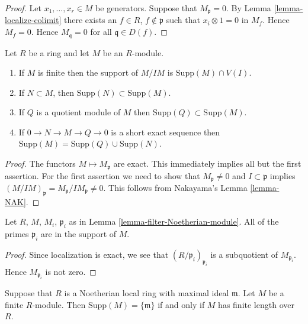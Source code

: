 \begin{proof}
Let $x_1, \ldots, x_r \in M$ be generators.
Suppose that $M_{\mathfrak p} = 0$.
By Lemma \ref{lemma-localize-colimit} there exists
an $f \in R$, $f\not\in \mathfrak p$ such that
$x_i\otimes 1 = 0$ in $M_f$. Hence $M_f = 0$.
Hence $M_{\mathfrak q} = 0$ for all $\mathfrak q\in D(f)$.
\end{proof}

\begin{lemma}
\label{lemma-support-quotient}
Let $R$ be a ring and let $M$ be an $R$-module.
\begin{enumerate}
\item If $M$ is finite then the support
of $M/IM$ is $\text{Supp}(M) \cap V(I)$.
\item If $N \subset M$, then $\text{Supp}(N) \subset
\text{Supp}(M)$.
\item If $Q$ is a quotient module of $M$ then $\text{Supp}(Q) \subset
\text{Supp}(M)$.
\item If $0 \to N \to M \to Q \to 0$ is a short exact sequence
then $\text{Supp}(M) = \text{Supp}(Q) \cup
\text{Supp}(N)$.
\end{enumerate}
\end{lemma}

\begin{proof}
The functors $M \mapsto M_{\mathfrak p}$ are exact. This immediately
implies all but the first assertion. For the first assertion
we need to show that $M_\mathfrak p \not = 0$ and
$I \subset \mathfrak p$ implies $(M/IM)_{\mathfrak p}
= M_\mathfrak p/IM_\mathfrak p \not = 0$. This follows
from Nakayama's Lemma \ref{lemma-NAK}.
\end{proof}

\begin{lemma}
\label{lemma-filter-primes-in-support}
Let $R$, $M$, $M_i$, $\mathfrak p_i$ as in
Lemma \ref{lemma-filter-Noetherian-module}.
All of the primes $\mathfrak p_i$ are in the support of
$M$.
\end{lemma}

\begin{proof}
Since localization is exact, we see that
$(R/\mathfrak p_i)_{\mathfrak p_i}$ is a
subquotient of $M_{\mathfrak p_i}$.
Hence $M_{\mathfrak p_i}$ is not zero.
\end{proof}

\begin{lemma}
\label{lemma-support-point}
Suppose that $R$ is a Noetherian local ring with
maximal ideal $\mathfrak m$. Let $M$ be a finite
$R$-module. Then $\text{Supp}(M) = \{ \mathfrak m\}$
if and only if $M$ has finite length over $R$.
\end{lemma}

